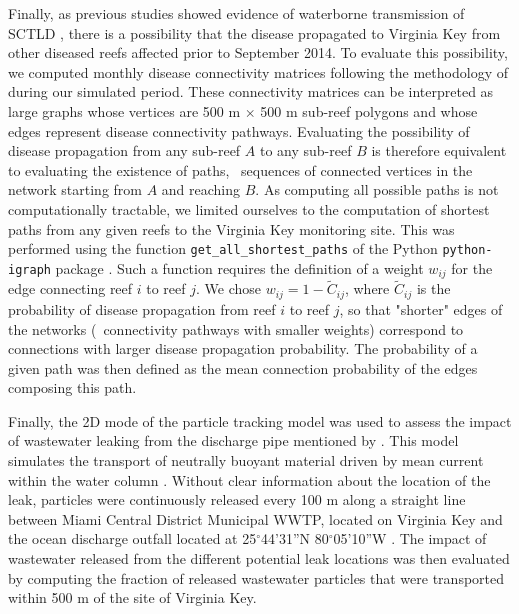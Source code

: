 Finally, as previous studies showed evidence of waterborne transmission of SCTLD \citep{aeby2019pathogenesis, dobbelaere2020coupled,eaton2021measuring, meiling2021variable}, there is a possibility that the disease propagated to Virginia Key from other diseased reefs affected prior to September 2014. To evaluate this possibility, we computed monthly disease connectivity matrices following the methodology of \cite{dobbelaere2020coupled} during our simulated period. These connectivity matrices can be interpreted as large graphs whose vertices are 500 m $\times$ 500 m sub-reef polygons and whose edges represent disease connectivity pathways. Evaluating the possibility of disease propagation from any sub-reef $A$ to any sub-reef $B$ is therefore equivalent to evaluating the existence of paths, \ie~sequences of connected vertices in the network starting from $A$ and reaching $B$. As computing all possible paths is not computationally tractable, we limited ourselves to the computation of shortest paths from any given reefs to the Virginia Key monitoring site. This was performed using the function \texttt{get\_all\_shortest\_paths} of the Python \texttt{python-igraph} package \citep{csardi2006igraph}. Such a function requires the definition of a weight $w_{ij}$ for the edge connecting reef $i$ to reef $j$. We chose $w_{ij} = 1-\tilde{C}_{ij}$, where $\tilde{C}_{ij}$ is the probability of disease propagation from reef $i$ to reef $j$, so that "shorter" edges of the networks (\ie~connectivity pathways with smaller weights) correspond to connections with larger disease propagation probability. The probability of a given path was then defined as the mean connection probability of the edges composing this path.

Finally, the 2D mode of the particle tracking model was used to assess the impact of wastewater leaking from the discharge pipe mentioned by \cite{gintert2019regional}. This model simulates the transport of neutrally buoyant material driven by mean current within the water column \citep{dobbelaere2020coupled}. Without clear information about the location of the leak, particles were continuously released every 100 m along a straight line between Miami Central District Municipal WWTP, located on Virginia Key and the ocean discharge outfall located at 25$^\circ$44'31''N 80$^\circ$05'10''W \citep{koopman2006ocean}. The impact of wastewater released from the different potential leak locations was then evaluated by computing the fraction of released wastewater particles that were transported within 500 m of the site of Virginia Key.

